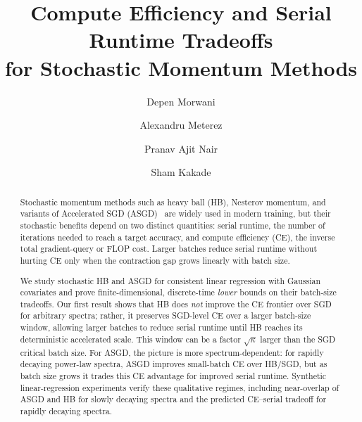\documentclass{article}
\title{Compute Efficiency and Serial Runtime Tradeoffs \\for Stochastic Momentum Methods}
\author[*,1,2,$\dagger$]{Depen Morwani}
\author[*,1,2]{Alexandru Meterez}
\author[*,1,2]{Pranav Ajit Nair}
\author[1,2]{Sham Kakade}
\affil[1]{Harvard University}
\affil[2]{Kempner Institute at Harvard University}
\begin{document}
\maketitle

\begin{abstract}
Stochastic momentum methods such as heavy ball (HB), Nesterov momentum, and
variants of Accelerated SGD (ASGD)~\citep{kidambi2018insufficiency} are widely
used in modern training, but their stochastic benefits depend on two distinct
quantities: serial runtime, the number of iterations needed to reach a target
accuracy, and compute efficiency (CE), the inverse total gradient-query or FLOP
cost. Larger batches reduce serial runtime without hurting CE only when the
contraction gap grows linearly with batch size.

We study stochastic HB and ASGD for consistent linear regression with Gaussian
covariates and prove finite-dimensional, discrete-time \emph{lower} bounds on their batch-size tradeoffs. Our first result shows that HB does \emph{not} improve the CE frontier over SGD for arbitrary spectra; rather, it preserves SGD-level CE over a larger batch-size window, allowing larger batches to reduce serial runtime
until HB reaches its deterministic accelerated scale. This window can be a
factor \(\sqrt{\kappa}\) larger than the SGD critical batch size. For ASGD, the
picture is more spectrum-dependent: for rapidly decaying power-law spectra,
ASGD improves small-batch CE over HB/SGD, but as batch size grows it trades this
CE advantage for improved serial runtime. Synthetic linear-regression
experiments verify these qualitative regimes, including near-overlap of ASGD
and HB for slowly decaying spectra and the predicted CE--serial tradeoff for
rapidly decaying spectra.
\end{abstract}
\end{document}
